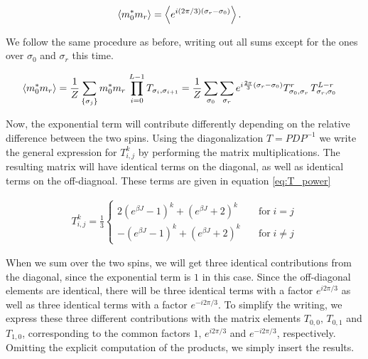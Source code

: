 \documentclass[reprint,english,notitlepage,aps,nobalancelastpage,nofootinbib]{revtex4-1}
\newcommand{\sumstate}{\sum_{\{\sigma_j\}}}
\newcommand{\prodstate}{\prod_{i=0}^{L-1}}
\newcommand{\ebj}{e^{\beta J}}
\newcommand{\T}[1]{T_{\sigma_{#1},\sigma_{#1 + 1}}}
\begin{document}
\begin{align*}
	\expval{m_0^* m_r} &= \expval{e^{i(2\pi/3)(\sigma_r - \sigma_0)}}.
\end{align*}

We follow the same procedure as before, writing out all sums except for the ones over $\sigma_0$ and $\sigma_r$ this time. 

\begin{align*}
	\expval{m_0^* m_r} &= \frac{1}{Z} \sumstate m_0^* m_r \, \prodstate \T{i} = \frac{1}{Z} \sum_{\sigma_0} \sum_{\sigma_r} e^{i\frac{2\pi}{3}(\sigma_r-\sigma_0)} T_{\sigma_0,\sigma_r}^{r} \, T_{\sigma_r,\sigma_0}^{L-r} 
\end{align*}

Now, the exponential term will contribute differently depending on the relative difference between the two spins. Using the diagonalization $T=PDP^{-1}$ we write the general expression for $T_{i,j}^k$ by performing the matrix multiplications. The resulting matrix will have identical terms on the diagonal, as well as identical terms on the off-diagnoal. These terms are given in equation \eqref{eq:T_power}  

\begin{align} \label{eq:T_power}
	T_{i,j}^k = \frac{1}{3}\begin{cases}
		2(\ebj-1)^k + (\ebj+2)^k \quad &\mathrm{for}\; i=j \\ 
		-(\ebj-1)^k + (\ebj+2)^k \quad &\mathrm{for}\; i\neq j
	\end{cases}
\end{align}

When we sum over the two spins, we will get three identical contributions from the diagonal, since the exponential term is $1$ in this case. Since the off-diagonal elements are identical, there will be three identical terms with a factor $e^{i2\pi/3}$ as well as three identical terms with a factor $e^{-i2\pi/3}$. To simplify the writing, we express these three different contributions with the matrix elements $T_{0,0},\,T_{0,1}$ and $T_{1,0}$, corresponding to the common factors $1,\,e^{i2\pi/3}$ and $e^{-i2\pi/3}$, respectively. Omitting the explicit computation of the products, we simply insert the results.  
\end{document}
